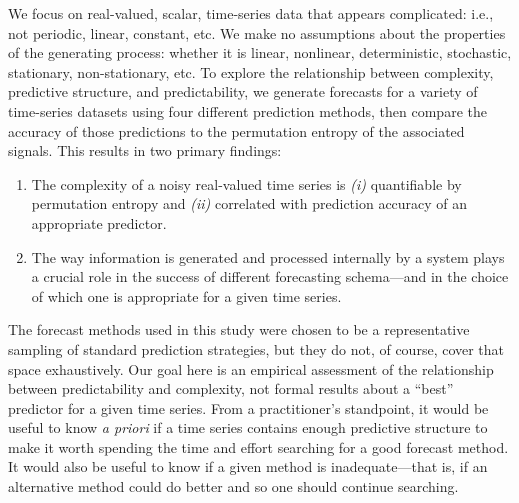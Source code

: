 We focus on real-valued, scalar, time-series data that appear\alert{s}
complicated: i.e., not periodic, linear, constant, etc.  We make no
assumptions about the properties of the generating process: whether it
is linear, nonlinear, deterministic, stochastic, stationary,
non-stationary, etc.
To explore the relationship between complexity, predictive structure,
and predictability, we generate forecasts for a variety of time-series
datasets using four different prediction methods, then compare the
accuracy of those predictions to the permutation entropy of the
associated signals.  This results in two primary findings:
\begin{enumerate}
\item The complexity of a noisy real-valued time series is {\sl (i)}
  quantifiable by permutation entropy and {\sl (ii)} correlated with prediction
  accuracy of an appropriate predictor.
\item The way information is generated and processed internally by a
  system plays a crucial role in the success of different forecasting
  schema---and in the choice of which one is appropriate for a given 
time series.
\end{enumerate}
The forecast methods used in this study were chosen to be a
representative sampling of standard prediction strategies, but they do
not, of course, cover that space exhaustively.  Our goal here is an
empirical assessment of the relationship between predictability and
complexity, not formal results about a ``best'' predictor for a given
time series.  From a practitioner's standpoint, it would be useful to
know {\sl a priori} if a time series contains enough predictive structure to
make it worth spending the time and effort searching for a good
forecast method.  It would also be useful to know if a given method is
inadequate---that is, if an alternative method could do better and so 
one should continue searching.


